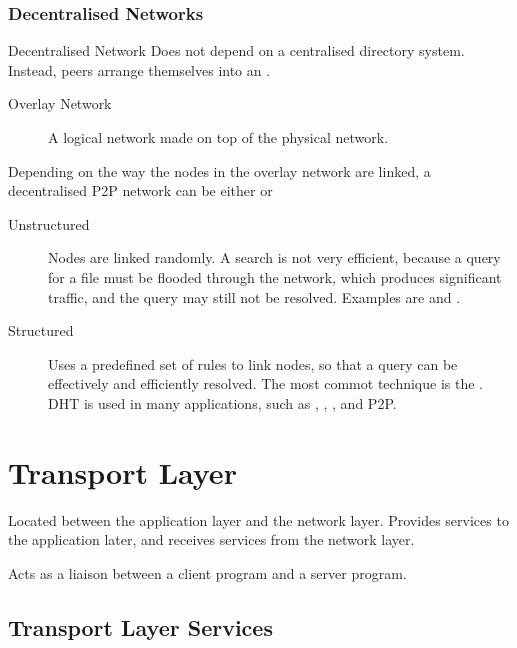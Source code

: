 \documentclass[\main/notes.tex]{subfiles}
\begin{document}
				\subsubsection{Decentralised Networks}
					\begin{definition}{Decentralised Network}
						Does not depend on a centralised directory system. Instead, peers arrange themselves into an .
						\begin{indentparagraph}
							\begin{description}
								\item[Overlay Network] A logical network made on top of the physical network.
							\end{description}
						\end{indentparagraph}
						Depending on the way the nodes in the overlay network are linked, a decentralised P2P network can be either  or 
						\begin{indentparagraph}
							\begin{description}
								\item[Unstructured] Nodes are linked randomly. A search is not very efficient, because a query for a file must be flooded through the network, which produces significant traffic, and the query may still not be resolved. Examples are  and .
								\item[Structured] Uses a predefined set of rules to link nodes, so that a query can be effectively and efficiently resolved. The most commot technique is the . DHT is used in many applications, such as , , , and P2P.
							\end{description}
						\end{indentparagraph}
					\end{definition}

		\section{Transport Layer}	
			Located between the application layer and the network layer. Provides services to the application later, and receives services from the network layer.

			Acts as a liaison between a client program and a server program.
			\subsection{Transport Layer Services}
\end{document}

